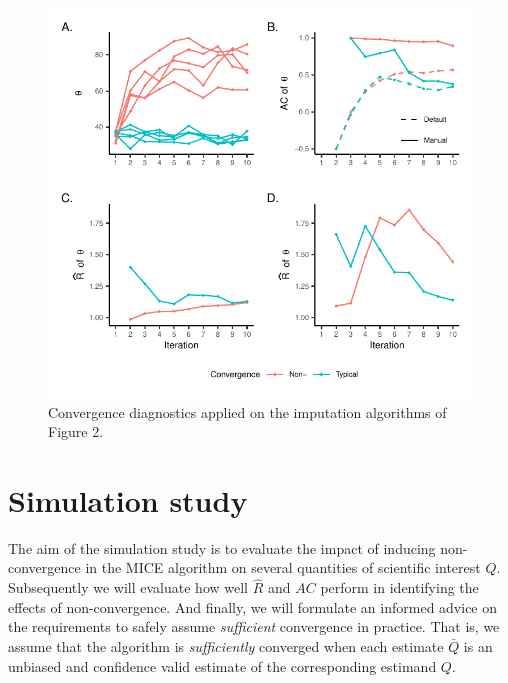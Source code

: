 \documentclass[Royal,times,sageh]{sagej}
\begin{document}
\begin{figure}

{\centering \includegraphics{manuscript_files/figure-latex/diagnostics-1} 

}

\caption{Convergence diagnostics applied on the imputation algorithms of Figure 2.}\label{fig:diagnostics}
\end{figure}

\hypertarget{simulation-study}{%
\section{Simulation study}\label{simulation-study}}

The aim of the simulation study is to evaluate the impact of inducing
non-convergence in the MICE algorithm on several quantities of
scientific interest \(Q\). Subsequently we will evaluate how well
\(\widehat{R}\) and \(AC\) perform in identifying the effects of
non-convergence. And finally, we will formulate an informed advice on
the requirements to safely assume \emph{sufficient} convergence in
practice. That is, we assume that the algorithm is \emph{sufficiently}
converged when each estimate \(\bar{Q}\) is an unbiased and confidence
valid estimate of the corresponding estimand \(Q\).
\end{document}
